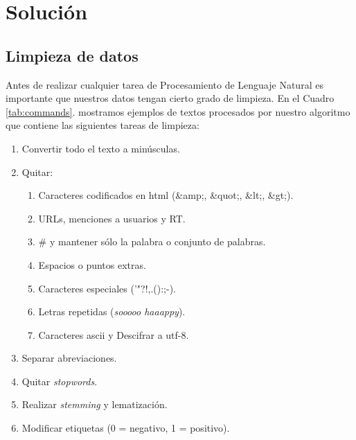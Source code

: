 \documentclass[sigconf, nonacm, spanish]{acmart}
\begin{document}
\section{Solución}
\subsection{Limpieza de datos}
Antes de realizar cualquier tarea de Procesamiento de Lenguaje Natural es importante que nuestros datos tengan cierto grado de limpieza. En el Cuadro \ref{tab:commands}. mostramos ejemplos de textos procesados por nuestro algoritmo que contiene las siguientes tareas de limpieza:

\begin{enumerate}
\item Convertir todo el texto a minúsculas.
\item Quitar:
\begin{enumerate}
    \item Caracteres codificados en html (\&amp;, \&quot;, \&lt;, \&gt;).
    \item URLs, menciones a usuarios y RT.
    \item \# y mantener sólo la palabra o conjunto de palabras.
    \item Espacios o puntos extras.
    \item Caracteres especiales (’"?!,.():;-).
    \item Letras repetidas (\textit{sooooo haaappy}).
    \item Caracteres ascii y Descifrar a utf-8.
\end{enumerate}
\item Separar abreviaciones.
\item Quitar \textit{stopwords}.
\item Realizar \textit{stemming} y lematización.
\item Modificar etiquetas (0 = negativo, 1 = positivo).

\end{enumerate}
\end{document}
